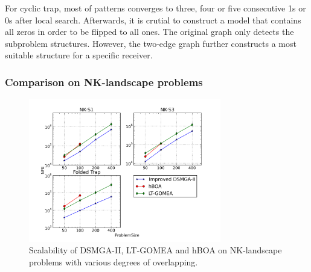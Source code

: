 \documentclass{sig-alternate-05-2015}
\begin{document}
For cyclic trap, most of patterns converges to three, four or five consecutive 1s or 0s after local search.
Afterwards, it is crutial to construct a model that contains all zeros in order to be flipped to all ones. 
The original graph only detects the subproblem structures. However, the two-edge graph further constructs a most suitable structure for a specific receiver. 



\subsubsection{ Comparison on NK-landscape problems }

\begin{figure}
\centering
\includegraphics[width=3.3in]{nkResults}
\caption{Scalability of DSMGA-II, LT-GOMEA and hBOA on NK-landscape problems with various degrees of overlapping.}
\end{figure}
\end{document}
